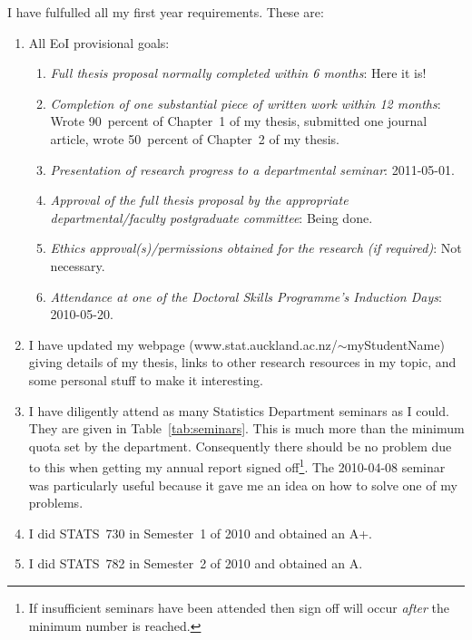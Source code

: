 \documentclass[12pt,a4paper]{article}
\begin{document}
I have fulfulled all my first year requirements.
These are:
\begin{enumerate}

\item
All EoI provisional goals:
\begin{enumerate}

\item
\textit{Full thesis proposal normally completed within 6 months}:
Here it is!

\item
\textit{Completion of one substantial piece of written work within
12 months}: Wrote 90~percent of Chapter~1 of my thesis, submitted
one journal article, wrote 50~percent of Chapter~2 of my thesis.


\item
\textit{Presentation of research progress to a departmental seminar}:
2011-05-01.

\item
\textit{Approval of the full thesis proposal by the appropriate
departmental/faculty postgraduate committee}:
Being done.

\item
\textit{Ethics approval(s)/permissions obtained for the research
(if required)}:
Not necessary.

\item
\textit{Attendance at one of the Doctoral Skills Programme's
Induction Days}:
2010-05-20.

\end{enumerate}





\item
I have updated my webpage
(\textsf{www.stat.auckland.ac.nz/$\sim$myStudentName})
giving details of my thesis, links to other research resources
in my topic, and some personal stuff to make it interesting.


\item
I have diligently attend as many Statistics Department seminars
as I could. They are given in Table~\ref{tab:seminars}.
This is much more than the minimum quota set by the department.
Consequently there should be no problem due to this when getting
my annual report signed off\footnote{If insufficient seminars have
been attended then sign off will occur \textit{after} the minimum number
is reached.}.
The 2010-04-08 seminar was particularly useful because it gave
me an idea on how to solve one of my problems.


\item
I did STATS~730 in Semester~1 of 2010 and obtained an A+.


\item
I did STATS~782 in Semester~2 of 2010 and obtained an A.



\end{enumerate}
\end{document}
